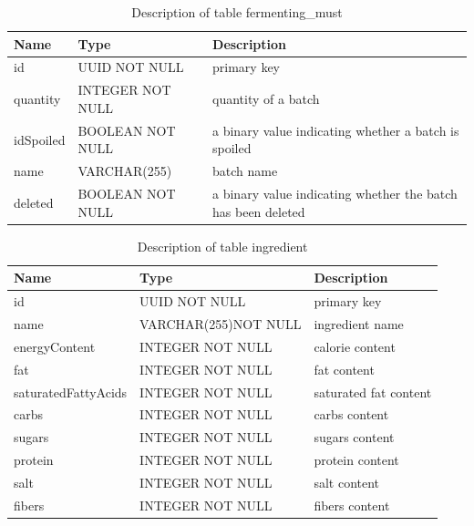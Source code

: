 \begin{table}[th]
	\centering
	\caption{Description of table fermenting\_must}
	\begin{tabular}{|m{}|m{}|m{}|}
		\hline
		Name & Type & Description  \\ \hline
		id & UUID NOT NULL & primary key\\ \hline
		quantity & INTEGER NOT NULL & quantity of a batch\\ \hline
		idSpoiled & BOOLEAN NOT NULL & a binary value indicating whether a batch is spoiled\\ \hline
		name & VARCHAR(255) & batch name\\ \hline
		deleted & BOOLEAN NOT NULL & a binary value indicating whether the batch has been deleted\\ \hline
	\end{tabular}
\end{table}
\begin{table}[th]
	\centering
	\caption{Description of table ingredient}
	\begin{tabular}{|m{}|m{}|m{}|}
		\hline
		Name & Type & Description  \\
		\hline
		id & UUID NOT NULL & primary key\\ \hline
		name & VARCHAR(255)\newline NOT NULL & ingredient name\\ \hline
		energyContent & INTEGER NOT NULL & calorie content\\ \hline
		fat & INTEGER NOT NULL & fat content\\ \hline
		saturatedFattyAcids & INTEGER NOT NULL & saturated fat content\\ \hline
		carbs & INTEGER NOT NULL & carbs content\\ \hline
		sugars & INTEGER NOT NULL & sugars content\\ \hline
		protein & INTEGER NOT NULL & protein content\\ \hline
		salt & INTEGER NOT NULL & salt content\\ \hline
		fibers & INTEGER NOT NULL & fibers content\\ \hline
	\end{tabular}
\end{table}
